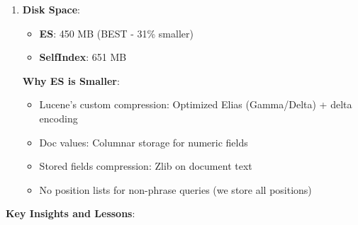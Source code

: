 \documentclass[12pt,a4paper]{article}
\begin{document}
\begin{enumerate}
    \item \textbf{Disk Space}:
    \begin{itemize}
        \item \textbf{ES}: 450 MB (BEST - 31\% smaller)
        \item \textbf{SelfIndex}: 651 MB
    \end{itemize}
    
    \textbf{Why ES is Smaller}:
    \begin{itemize}
        \item Lucene's custom compression: Optimized Elias (Gamma/Delta) + delta encoding
        \item Doc values: Columnar storage for numeric fields
        \item Stored fields compression: Zlib on document text
        \item No position lists for non-phrase queries (we store all positions)
    \end{itemize}
\end{enumerate}

\textbf{Key Insights and Lessons}:
\end{document}
